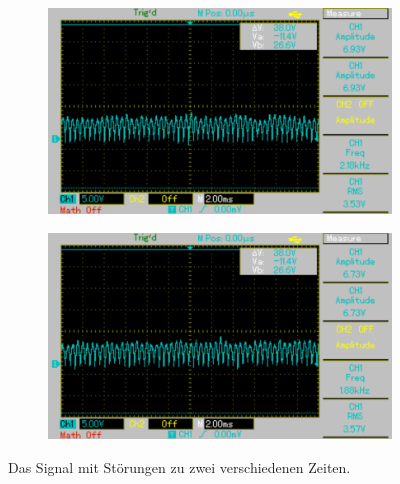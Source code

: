 \begin{figure}[htbp]
	\begin{subfigure}{0.45\textwidth}
		\includegraphics[width=\textwidth]{Bilder/MAP002.pdf}
	\end{subfigure}
	\begin{subfigure}{0.45\textwidth}
		\includegraphics[width=\textwidth]{Bilder/MAP003.pdf}
	\end{subfigure}
	\caption{Das Signal mit Störungen zu zwei verschiedenen Zeiten.}
	\label{fig:stoerung}
\end{figure}

